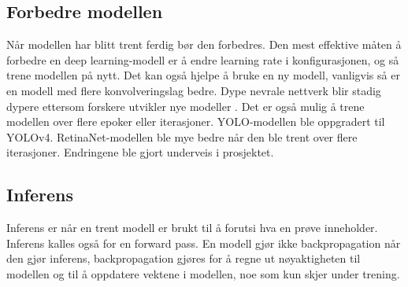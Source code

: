 
\subsection{Forbedre modellen}

Når modellen har blitt trent ferdig bør den forbedres. Den mest effektive måten å forbedre en deep learning-modell er å endre learning rate i konfigurasjonen, og så trene modellen på nytt. Det kan også hjelpe å bruke en ny modell, vanligvis så er en modell med flere konvolveringslag bedre. Dype nevrale nettverk blir stadig dypere ettersom forskere utvikler nye modeller \cite{Szegedy m.fl. s. 1}. Det er også mulig å trene modellen over flere epoker eller iterasjoner. YOLO-modellen ble oppgradert til YOLOv4. RetinaNet-modellen ble mye bedre når den ble trent over flere iterasjoner. Endringene ble gjort underveis i prosjektet. 


\subsection{Inferens}

Inferens er når en trent modell er brukt til å forutsi hva en prøve inneholder. Inferens kalles også for en forward pass. En modell gjør ikke backpropagation når den gjør inferens, backpropagation gjøres for å regne ut nøyaktigheten til modellen og til å oppdatere vektene i modellen, noe som kun skjer under trening. 


